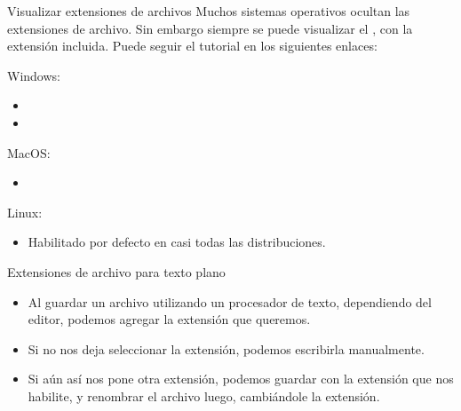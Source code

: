 
\begin{frame}{Visualizar extensiones de archivos}
  Muchos sistemas operativos ocultan las extensiones de archivo.
  \jump
  Sin embargo siempre se puede visualizar el , con la
  extensión incluida. Puede seguir el tutorial en los siguientes enlaces:

  Windows:
  \begin{itemize}
    \item {}
    \item {}
  \end{itemize}

  MacOS:
  \begin{itemize}
    \item {}
  \end{itemize}

  Linux:
  \begin{itemize}
    \item Habilitado por defecto en casi todas las distribuciones.
  \end{itemize}
\end{frame}


\begin{frame}{Extensiones de archivo para texto plano}
  \begin{itemize}
    \item Al guardar un archivo utilizando un procesador de texto, dependiendo del
      editor, podemos agregar la extensión que queremos.
    \item Si no nos deja seleccionar la extensión, podemos escribirla manualmente.
    \item Si aún así nos pone otra extensión, podemos guardar con la extensión que
      nos habilite, y renombrar el archivo luego, cambiándole la extensión.
  \end{itemize}
\end{frame}

